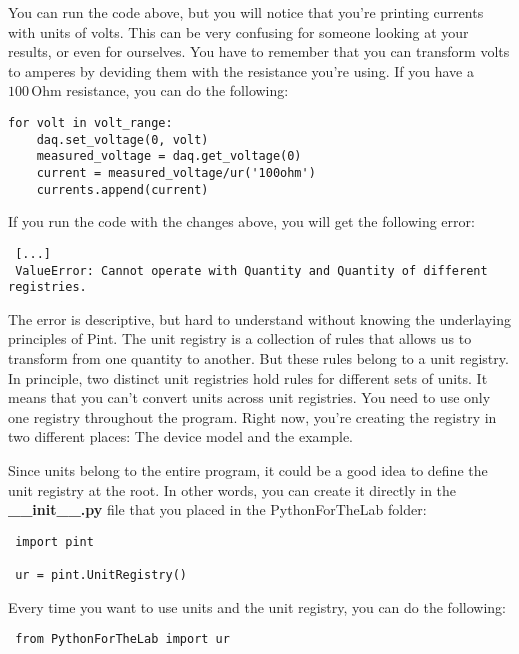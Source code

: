 You can run the code above, but you will notice that you're printing currents with units of volts. This can be very confusing for someone looking at your results, or even for ourselves. You have to remember that you can transform volts to amperes by deviding them with the resistance you're using. If you have a $100\,\textrm{Ohm}$ resistance, you can do the following:

\begin{verbatim}
for volt in volt_range:
    daq.set_voltage(0, volt)
    measured_voltage = daq.get_voltage(0)
    current = measured_voltage/ur('100ohm')
    currents.append(current)
\end{verbatim}

If you run the code with the changes above, you will get the following error:

\begin{verbatim}
 [...]
 ValueError: Cannot operate with Quantity and Quantity of different registries.
\end{verbatim}

The error is descriptive, but hard to understand without knowing the underlaying principles of Pint. The unit registry is a collection of rules that allows us to transform from one quantity to another. But these rules belong to a unit registry. In principle, two distinct unit registries hold rules for different sets of units. It means that you can't convert units across unit registries. You need to use only one registry throughout the program. Right now, you're creating the registry in two different places: The device model and the example.

Since units belong to the entire program, it could be a good idea to define the unit registry at the root. In other words, you can create it directly in the \textbf{\_\_init\_\_.py} file that you placed in the PythonForTheLab folder:

\begin{verbatim}
 import pint

 ur = pint.UnitRegistry()
\end{verbatim}

Every time you want to use units and the unit registry, you can do the following:

\begin{verbatim}
 from PythonForTheLab import ur
\end{verbatim}


